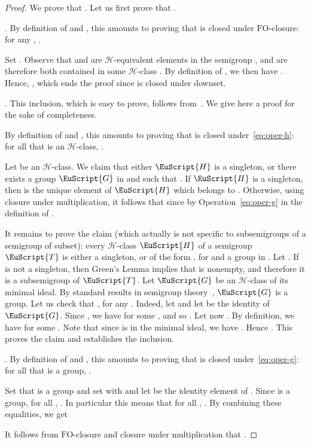 \documentclass{CSML}
\newcommand\Gs{\ensuremath{\EuScript{G}}\xspace}
\newcommand\Ts{\ensuremath{\EuScript{T}}\xspace}
\newcommand\Hs{\ensuremath{\EuScript{H}}\xspace}
\newcommand{\fo}{\ensuremath{\text{FO}}\xspace}
\newcommand\Hrel{\ensuremath{{\mathscr{H}}}}
\theoremstyle{plain}
\begin{document}
\begin{proof}
We prove that . Let us first prove that .

\medskip\noindent
{\boldmath.} By
definition of  and , this amounts to proving
that  is closed under \fo-closure: for any , .

Set . Observe that  and 
are \Hrel-equivalent elements in the semigroup , and are
therefore both contained in some \Hrel-class . By definition of , we then have
. Hence, , which ends the
proof since  is closed under downset.

\medskip\noindent
{\boldmath}. This inclusion, which is
easy to prove, follows
from~\cite{Henckell:Pointlike-sets:-finest-aperiodic:1988:a}. We give here a
proof for the sake of completeness.

By definition of  and ,
this amounts to proving that  is closed
under~\ref{eq:oper-h}: for all  that is
an \Hrel-class, .

Let  be an \Hrel-class. We claim that
either \Hs is a singleton, or there exists a group \Gs in
 and  such that .
If \Hs is a singleton, then  is the unique element of
\Hs which belongs to . Otherwise, using closure under
multiplication, it follows that  since  by
Operation~\ref{eq:oper-g} in the definition of .

It remains to prove the claim (which actually is not specific to
subsemigroups of a semigroup of subset): every \Hrel-class \Hs of
a semigroup \Ts is either a singleton, or of the form , for
  and  a group in .  Let . If  is not a singleton, then Green's
 Lemma implies that  is nonempty, and therefore it is a
 subsemigroup of \Ts. Let \Gs be an \Hrel-class of its minimal
 ideal. By standard results in semigroup theory~\cite[Chapter~V]{Pin13:MPRI}, \Gs is a group. Let us
 check that , for any . Indeed, let 
 and let  be the identity of \Gs. Since , we have
  for some , and so . Let now
 . By definition, we have  for some
 . Note that since  is in the minimal ideal, we have
 . Hence . This proves the
 claim and establishes the inclusion.

\medskip\noindent
{\boldmath.} By definition of
 and , this amounts to proving that
 is closed under~\eqref{eq:oper-g}: for all  that is a group, .

Set  that is a group and set
 with  and let
 be the identity element of . Since  is a group,
for all , . In particular this means that
for all , .
By combining these equalities, we get

It follows from \fo-closure and closure under multiplication that
.
\end{proof}
\end{document}
